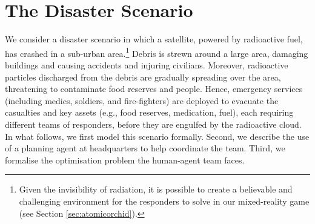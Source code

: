 \section{The Disaster Scenario}\label{sec:scenario}
\noindent We consider a disaster scenario in which a satellite, powered by radioactive fuel,  has crashed in a sub-urban area.\footnote{Given the invisibility of radiation, it is possible to create a believable and challenging environment for the responders to solve in our mixed-reality game (see Section \ref{sec:atomicorchid}).} Debris is strewn around a large area, damaging buildings and causing accidents and injuring civilians. Moreover, radioactive particles discharged from the debris are gradually spreading over the area, threatening to contaminate food reserves and people. Hence, emergency services (including medics, soldiers, and fire-fighters) are deployed to  evacuate the casualties and key assets (e.g., food reserves, medication, fuel), each requiring different teams of responders, before they are engulfed by the radioactive cloud.  In what follows, we first model this scenario formally. Second, we describe the use of a planning agent at headquarters to help coordinate the team. Third, we formalise  the optimisation problem the human-agent team faces.


